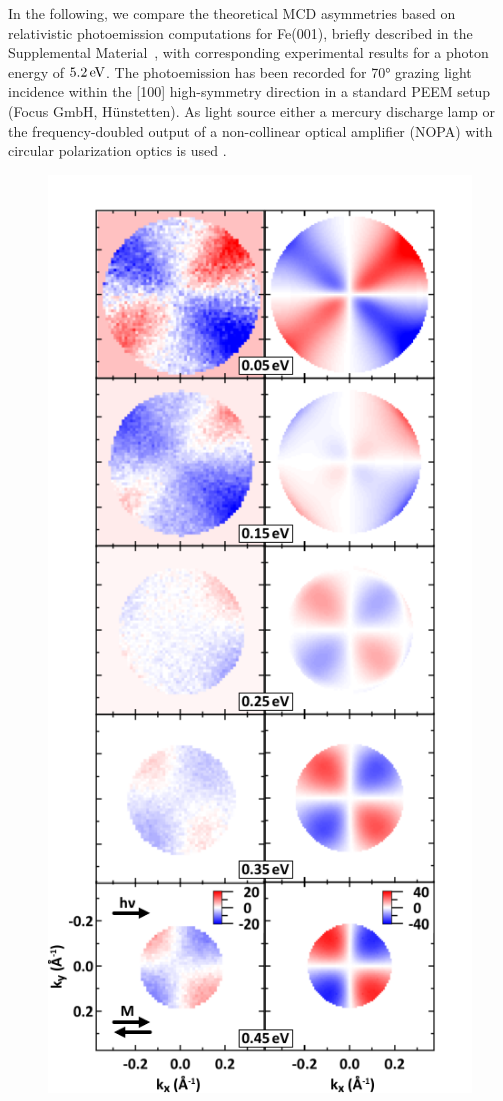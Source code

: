 \documentclass[prl,twocolumn,floatfix]{revtex4-2}
\begin{document}
In the following, we compare the theoretical MCD asymmetries based on relativistic photoemission computations for Fe(001), briefly described in the Supplemental Material~\cite{Supplement}, with corresponding experimental results for a photon energy of $\unit[5.2]{eV}$. The photoemission has been recorded for 70° grazing light incidence within the [100] high-symmetry direction in a standard PEEM setup (Focus GmbH, Hünstetten). As light source either a mercury discharge lamp or the frequency-doubled output of a non-collinear optical amplifier (NOPA) with circular polarization optics is used \cite{duncker2012,gillmeister2020, paleschke2021}. 

\begin{figure}
    \centering
    \includegraphics[width = 0.7\columnwidth]{FePaperApol.pdf}

\end{figure}
\end{document}
